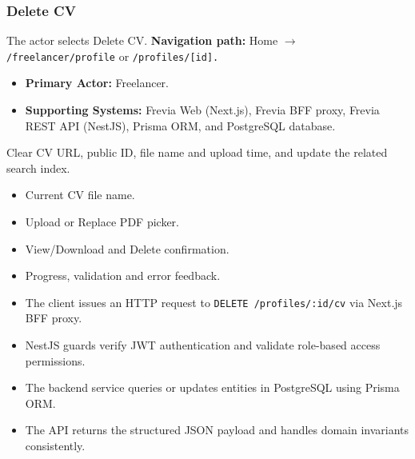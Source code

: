 \subsubsection{Delete CV}

The actor selects Delete CV.\newline
\textbf{Navigation path:} Home $\rightarrow$ \texttt{/\allowbreak{}freelancer/\allowbreak{}profile} or \texttt{/\allowbreak{}profiles/\allowbreak{}[id].}


\begin{itemize}[leftmargin=1.6em,topsep=3pt,itemsep=2pt,parsep=0pt,label=$\bullet$]
    \item \textbf{Primary Actor:} Freelancer.
    \item \textbf{Supporting Systems:} Frevia Web (Next.js), Frevia BFF proxy, Frevia REST API (NestJS), Prisma ORM, and PostgreSQL database.
\end{itemize}

\noindent Clear CV URL, public ID, file name and upload time, and update the related search index.

\begin{itemize}[leftmargin=1.6em,topsep=3pt,itemsep=2pt,parsep=0pt,label=$\bullet$]
    \item Current CV file name.
    \item Upload or Replace PDF picker.
    \item View/Download and Delete confirmation.
    \item Progress, validation and error feedback.
\end{itemize}

\begin{itemize}[leftmargin=1.6em,topsep=3pt,itemsep=2pt,parsep=0pt,label=$\bullet$]
    \item The client issues an HTTP request to \texttt{DELETE /\allowbreak{}profiles/\allowbreak{}:\allowbreak{}id/\allowbreak{}cv} via Next.js BFF proxy.
    \item NestJS guards verify JWT authentication and validate role-based access permissions.
    \item The backend service queries or updates entities in PostgreSQL using Prisma ORM.
    \item The API returns the structured JSON payload and handles domain invariants consistently.
\end{itemize}


